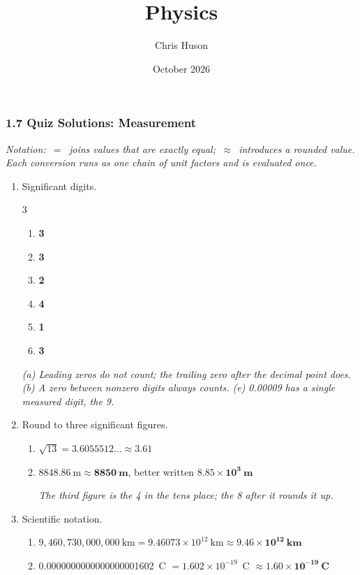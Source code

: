 \documentclass[12pt, twoside]{article}
\title{Physics}
\author{Chris Huson}
\date{October 2026}
\begin{document}
\subsubsection*{1.7 Quiz Solutions: Measurement}

\emph{Notation: \,$=$\, joins values that are exactly equal; \,$\approx$\, introduces a
rounded value. Each conversion runs as one chain of unit factors and is evaluated once.}

\begin{enumerate}[itemsep=0.25cm]

\item Significant digits.
  \begin{multicols}{3}
    \begin{enumerate}[itemsep=0.1cm]
      \item \textbf{3}
      \item \textbf{3}
      \item \textbf{2}
      \item \textbf{4}
      \item \textbf{1}
      \item \textbf{3}
    \end{enumerate}
  \end{multicols}
  \emph{(a) Leading zeros do not count; the trailing zero after the decimal point does.
  (b) A zero between nonzero digits always counts. (e) \num{0.00009} has a single
  measured digit, the 9.}

\item Round to three significant figures.
  \begin{enumerate}[itemsep=0.15cm]
    \item $\sqrt{13} = 3.6055512\ldots \approx \mathbf{3.61}$
    \item $8848.86~\text{m} \approx \mathbf{8850~\textbf{m}}$, better written
      $\mathbf{8.85 \times 10^{3}~\textbf{m}}$

      \emph{The third figure is the 4 in the tens place; the 8 after it rounds it up.}
  \end{enumerate}

\item Scientific notation.
  \begin{enumerate}[itemsep=0.15cm]
    \item $9{,}460{,}730{,}000{,}000~\text{km} = 9.46073 \times 10^{12}~\text{km}
      \approx \mathbf{9.46 \times 10^{12}~\textbf{km}}$
    \item \num{0.0000000000000000001602}~C $= 1.602 \times 10^{-19}$~C
      $\approx \mathbf{1.60 \times 10^{-19}~\textbf{C}}$


\end{enumerate}
\end{enumerate}
\end{document}

